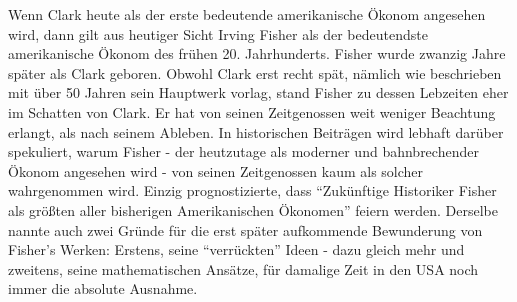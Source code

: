 Wenn Clark heute als der erste bedeutende amerikanische Ökonom angesehen wird, dann gilt aus heutiger Sicht Irving Fisher als der bedeutendste amerikanische Ökonom des frühen 20. Jahrhunderts. Fisher wurde zwanzig Jahre später als Clark geboren. Obwohl Clark erst recht spät, nämlich wie beschrieben mit über 50 Jahren sein Hauptwerk vorlag, stand Fisher zu dessen Lebzeiten eher im Schatten von Clark. Er hat von seinen Zeitgenossen weit weniger Beachtung erlangt, als nach seinem Ableben. In historischen Beiträgen wird lebhaft darüber spekuliert, warum Fisher - der heutzutage als moderner und bahnbrechender Ökonom angesehen wird - von seinen Zeitgenossen kaum als solcher wahrgenommen wird. Einzig \textcite[S. 872]{Schumpeter1954} prognostizierte, dass "`Zukünftige Historiker Fisher als größten aller bisherigen Amerikanischen Ökonomen"' feiern werden. Derselbe nannte auch zwei Gründe für die erst später aufkommende Bewunderung von Fisher's Werken: Erstens, seine "`verrückten"' Ideen - dazu gleich mehr und zweitens, seine mathematischen Ansätze, für damalige Zeit in den USA noch immer die absolute Ausnahme.

